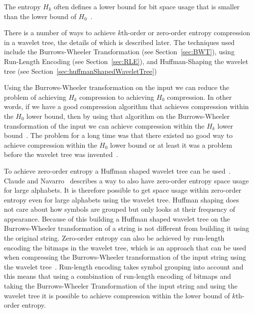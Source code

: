 The entropy $H_k$ often defines a lower bound for bit space usage that is smaller than the lower bound of $H_0$~.

There is a number of ways to achieve $k$th-order or zero-order entropy compression in a wavelet tree, the details of which is described later.
The techniques used include the Burrows-Wheeler Transformation (see Section~\ref{sec:BWT}), using Run-Length Encoding (see Section~\ref{sec:RLE}), and Huffman-Shaping the wavelet tree (see Section~\ref{sec:huffmanShapedWaveletTree})

Using the Burrows-Wheeler transformation on the input we can reduce the problem of achieving $H_k$ compression to achieving $H_0$ compression.
In other words, if we have a good compression algorithm that achieves compression within the $H_0$ lower bound, then by using that algorithm on the Burrows-Wheeler transformation of the input we can achieve compression within the $H_k$ lower bound~.
The problem for a long time was that there existed no good way to achieve compression within the $H_0$ lower bound or at least it was a problem before the wavelet tree was invented~.

To achieve zero-order entropy a Huffman shaped wavelet tree can be used~. Claude and Navarro~ describes a way to also have zero-order entropy space usage for large alphabets. 
It is therefore possible to get space usage within zero-order entropy even for large alphabets using the wavelet tree. 
Huffman shaping does not care about how symbols are grouped but only looks at their frequency of appearance.
Because of this building a Huffman shaped wavelet tree on the Burrows-Wheeler transformation of a string is not different from building it using the original string.
Zero-order entropy can also be achieved by run-length encoding the bitmaps in the wavelet tree, which is an approach that can be used when compressing the Burrows-Wheeler transformation of the input string using the wavelet tree~.
Run-length encoding takes symbol grouping into account and this means that using a combination of run-length encoding of bitmaps and taking the Burrows-Wheeler Transformation of the input string and using the wavelet tree it is possible to achieve compression within the lower bound of $k$th-order entropy.


